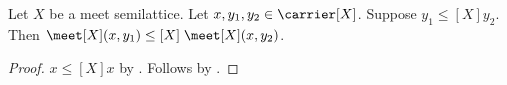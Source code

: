 \begin{proposition}\label{meet_monotone_right}
    Let $X$ be a meet semilattice.
    Let $x,y_1,y_2\in\carrier[X]$.
    Suppose $y_1\mathrel{\leq[X]}y_2$.
    Then $\meet[X](x,y_1)\mathrel{\leq[X]}\meet[X](x,y_2)$.
\end{proposition}
\begin{proof}
    $x\mathrel{\leq[X]}x$ by
        .
    Follows by .
\end{proof}

